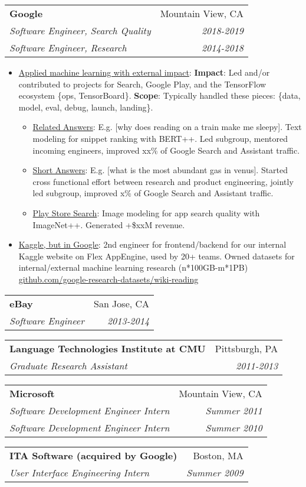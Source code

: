 \documentclass[letterpaper,9pt]{article}
\makeatletter
\newcommand{\resumeItem}[2]{
  \item\small{
    \underline{#1}{: #2 \vspace{-2pt}}
  }
}
\newcommand{\resumeSubheading}[4]{
  \vspace{-1pt}\item
    \begin{tabular*}{0.97\textwidth}[t]{l@{\extracolsep{\fill}}r}
      \textbf{#1} & #2 \\
      \textit{\small#3} & \textit{\small #4} \\
    \end{tabular*}\vspace{-5pt}
}
\newcommand{\resumeDoubleSubheading}[6]{
  \vspace{-1pt}\item
    \begin{tabular*}{0.97\textwidth}[t]{l@{\extracolsep{\fill}}r}
      \textbf{#1} & #2 \\
      \textit{\small#3} & \textit{\small #4} \\
      \textit{\small#5} & \textit{\small #6} \\
    \end{tabular*}\vspace{-5pt}
}
\newcommand{\resumeItemListStart}{\begin{itemize}}
\newcommand{\resumeItemListEnd}{\end{itemize}\vspace{-5pt}}
\makeatother
\begin{document}
    \resumeDoubleSubheading
      {Google}{Mountain View, CA}
      {Software Engineer, Search Quality}{2018-2019}
      {Software Engineer, Research}{2014-2018}
      \resumeItemListStart
        \resumeItem{Applied machine learning with external impact}
          {
              \newline \textbf{Impact}: Led and/or contributed to projects for Search, Google Play, and the TensorFlow ecosystem \{ops, TensorBoard\}.
              \newline \textbf{Scope}: Typically handled these pieces: \{data, model, eval, debug, launch, landing\}.
          }
          \resumeItemListStart
            \resumeItem{Related Answers}{E.g. [why does reading on a train make me sleepy]. Text modeling for snippet ranking with BERT++. Led subgroup, mentored incoming engineers, improved xx\% of Google Search and Assistant traffic.}
            \resumeItem{Short Answers}{E.g. [what is the most abundant gas in venus]. Started cross functional effort between research and product engineering, jointly led subgroup, improved x\% of Google Search and Assistant traffic.}
            \resumeItem{Play Store Search}{Image modeling for app search quality with ImageNet++. Generated +\$xxM revenue.}
          \resumeItemListEnd
          \vspace{4pt}
        \resumeItem{Kaggle, but in Google}
          {
              \newline 2nd engineer for frontend/backend for our internal Kaggle website on Flex AppEngine, used by 20+ teams.
              \newline Owned datasets for internal/external machine learning research (n*100GB-m*1PB)
              \href{https://github.com/google-research-datasets/wiki-reading}{github.com/google-research-datasets/wiki-reading}
          }
      \resumeItemListEnd

    \resumeSubheading
      {eBay}{San Jose, CA}
      {Software Engineer}{2013-2014}
      
    \resumeSubheading
      {Language Technologies Institute at CMU}{Pittsburgh, PA}
      {Graduate Research Assistant}{2011-2013}
      
    \resumeDoubleSubheading
      {Microsoft}{Mountain View, CA}
      {Software Development Engineer Intern}{Summer 2011}
      {Software Development Engineer Intern}{Summer 2010}
      
    \resumeSubheading
      {ITA Software (acquired by Google)}{Boston, MA}
      {User Interface Engineering Intern}{Summer 2009}
      
\end{document}
